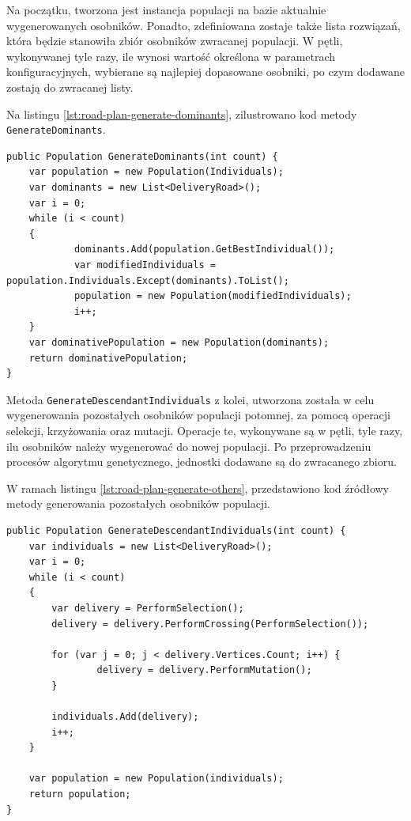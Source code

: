 Na początku, tworzona jest instancja populacji na bazie aktualnie wygenerowanych osobników. Ponadto, zdefiniowana zostaje także lista rozwiązań, która będzie stanowiła zbiór osobników zwracanej populacji. W pętli, wykonywanej tyle razy, ile wynosi wartość określona w parametrach konfiguracyjnych, wybierane są najlepiej dopasowane osobniki, po czym dodawane zostają do zwracanej listy. 

Na listingu \ref{lst:road-plan-generate-dominants}, zilustrowano kod metody \texttt{GenerateDominants}.

\begin{lstlisting}[label=lst:road-plan-generate-dominants,caption=Kod metody generującej zbiór osobników dominujących dla nowej populacji, captionpos=b,basicstyle=\footnotesize\ttfamily,style=sharpcstyle,language={[Sharp]C}]
public Population GenerateDominants(int count) {
	var population = new Population(Individuals);
	var dominants = new List<DeliveryRoad>();
	var i = 0;
	while (i < count)
	{
			dominants.Add(population.GetBestIndividual());
			var modifiedIndividuals = population.Individuals.Except(dominants).ToList();
			population = new Population(modifiedIndividuals);
			i++;
	}
	var dominativePopulation = new Population(dominants);
	return dominativePopulation;
}
\end{lstlisting}

Metoda \texttt{GenerateDescendantIndividuals} z kolei, utworzona została w celu wygenerowania pozostałych osobników populacji potomnej, za pomocą operacji selekcji, krzyżowania oraz mutacji. Operacje te, wykonywane są w pętli, tyle razy, ilu osobników należy wygenerować do nowej populacji. Po przeprowadzeniu procesów algorytmu genetycznego, jednostki dodawane są do zwracanego zbioru.

W ramach listingu \ref{lst:road-plan-generate-others}, przedstawiono kod źródłowy metody generowania pozostałych osobników populacji.

\begin{lstlisting}[label=lst:road-plan-generate-others,caption=Kod metody generującej zbiór pozostałych osobników dla nowej populacji, captionpos=b,basicstyle=\footnotesize\ttfamily,style=sharpcstyle,language={[Sharp]C}]
public Population GenerateDescendantIndividuals(int count) {
	var individuals = new List<DeliveryRoad>();
	var i = 0;
	while (i < count)
	{
		var delivery = PerformSelection();
		delivery = delivery.PerformCrossing(PerformSelection());

		for (var j = 0; j < delivery.Vertices.Count; i++) {
				delivery = delivery.PerformMutation();
		}
		
		individuals.Add(delivery);
		i++;
	}

	var population = new Population(individuals);
	return population;
}
\end{lstlisting}

